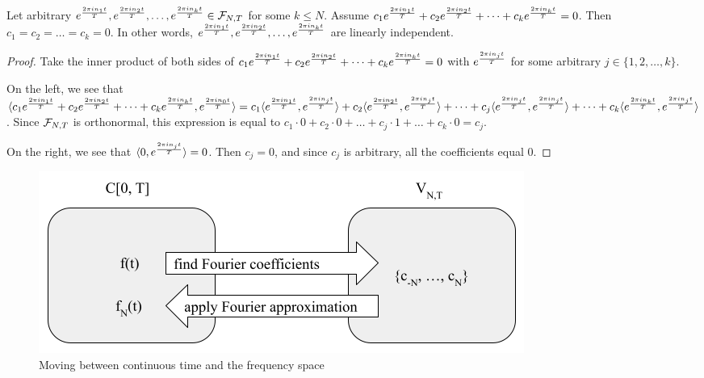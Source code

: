 \begin{theorem}
    \par Let arbitrary $e^{\frac{2 \pi i n_1t}{T}},e^{\frac{2 \pi i n_2t}{T}},\dots,e^{\frac{2 \pi i n_kt}{T}}\in\mathcal{F}_{N,T}$ for some $k \le N$. Assume $c_1e^{\frac{2 \pi i n_1t}{T}} + c_2e^{\frac{2 \pi i n_2t}{T}} + \dots + c_ke^{\frac{2 \pi i n_kt}{T}} = 0$. Then $c_1 = c_2 = \dots = c_k = 0$. In other words, $e^{\frac{2 \pi i n_1t}{T}},e^{\frac{2 \pi i n_2t}{T}},\dots,e^{\frac{2 \pi i n_kt}{T}}$ are linearly independent.
    
    \begin{proof}
        \par Take the inner product of both sides of $c_1e^{\frac{2 \pi i n_1t}{T}} + c_2e^{\frac{2 \pi i n_2t}{T}} + \dots + c_ke^{\frac{2 \pi i n_kt}{T}} = 0$ with $e^{\frac{2 \pi i n_jt}{T}}$ for some arbitrary $j\in\{1,2,\dots,k\}$.
        
        \par \bigskip On the left, we see that $\langle c_1e^{\frac{2 \pi i n_1t}{T}} + c_2e^{\frac{2 \pi i n_2t}{T}} + \dots + c_ke^{\frac{2 \pi i n_kt}{T}},e^{\frac{2 \pi i n_0t}{T}} \rangle = c_1\langle e^{\frac{2 \pi i n_1t}{T}},e^{\frac{2 \pi i n_jt}{T}} \rangle + c_2\langle e^{\frac{2 \pi i n_2t}{T}},e^{\frac{2 \pi i n_jt}{T}} \rangle + \dots + c_j\langle e^{\frac{2 \pi i n_jt}{T}},e^{\frac{2 \pi i n_jt}{T}} \rangle + \dots + c_k\langle e^{\frac{2 \pi i n_kt}{T}},e^{\frac{2 \pi i n_jt}{T}} \rangle$. Since $\mathcal{F}_{N,T}$ is orthonormal, this expression is equal to $c_1\cdot 0 + c_2\cdot 0 + \dots + c_j\cdot 1 + \dots + c_k\cdot 0 = c_j$.
        
        \par \bigskip On the right, we see that $\langle 0,e^{\frac{2 \pi i n_jt}{T}} \rangle = 0$. Then $c_j = 0$, and since $c_j$ is arbitrary, all the coefficients equal 0.
    \end{proof}
    \label{thm:complex_F_lin_indep}
\end{theorem}

\begin{figure}[h]
    \centering
    \includegraphics[scale=.5]{real_F_space_diagram.png}
    \caption{Moving between continuous time and the frequency space}
    \label{fig:real_F_space_diagram}
\end{figure}

